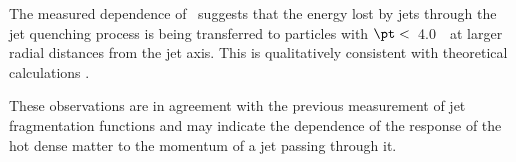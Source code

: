 
The measured dependence of \RDptr\ suggests that the energy lost by jets through the jet quenching process is being transferred to particles with $\pt <$~4.0~\GeV\ at larger radial distances from the jet axis. This is qualitatively consistent with theoretical calculations \mbox{\cite{Qin:2015srf,Blaizot:2014ula}}.


These observations are in agreement with the previous measurement of jet fragmentation functions \cite{Chatrchyan:2014ava, Sirunyan:2018jqr, Aaboud:2017bzv, PhysRevC.98.024908} and may indicate the dependence of the response of the hot dense matter to the momentum of a jet passing through it. 


\FloatBarrier
